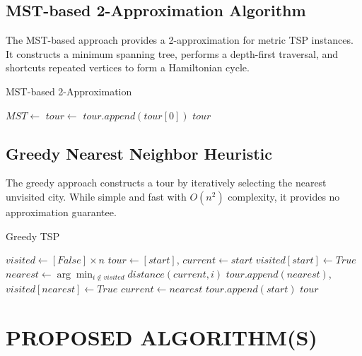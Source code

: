\documentclass[sigconf]{acmart}
\begin{document}
\subsection{MST-based 2-Approximation Algorithm}

The MST-based approach \cite{mst_blog} provides a 2-approximation for metric TSP instances. It constructs a minimum spanning tree, performs a depth-first traversal, and shortcuts repeated vertices to form a Hamiltonian cycle.

\begin{algorithm}
\caption{MST-based 2-Approximation}
\begin{algorithmic}[1]
    \State $MST \leftarrow $  
    \State $tour \leftarrow $  
    \State $tour.append(tour[0])$ 
    \State \Return $tour$
\EndFunction
\end{algorithmic}
\end{algorithm}

\subsection{Greedy Nearest Neighbor Heuristic}

The greedy approach constructs a tour by iteratively selecting the nearest unvisited city. While simple and fast with $O(n^2)$ complexity, it provides no approximation guarantee.

\begin{algorithm}
\caption{Greedy TSP}
\begin{algorithmic}[1]
    \State $visited \leftarrow [False] \times n$
    \State $tour \leftarrow [start]$, $current \leftarrow start$
    \State $visited[start] \leftarrow True$
        \State $nearest \leftarrow \arg\min_{i \notin visited} distance(current, i)$
        \State $tour.append(nearest)$, $visited[nearest] \leftarrow True$
        \State $current \leftarrow nearest$
    \EndFor
    \State $tour.append(start)$
    \State \Return $tour$
\EndFunction
\end{algorithmic}
\end{algorithm}

\section{PROPOSED ALGORITHM(S)}
\end{document}
